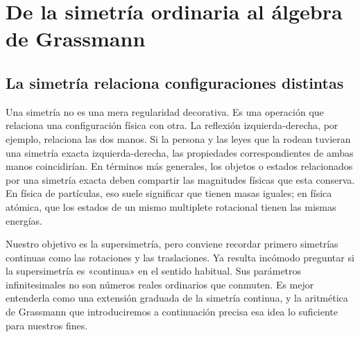 \chapter{De la simetría ordinaria al álgebra de Grassmann}


\section{La simetría relaciona configuraciones distintas}

Una simetría no es una mera regularidad decorativa. Es una operación que relaciona una configuración física con otra. La reflexión izquierda-derecha, por ejemplo, relaciona las dos manos. Si la persona y las leyes que la rodean tuvieran una simetría exacta izquierda-derecha, las propiedades correspondientes de ambas manos coincidirían. En términos más generales, los objetos o estados relacionados por una simetría exacta deben compartir las magnitudes físicas que esta conserva. En física de partículas, eso suele significar que tienen masas iguales; en física atómica, que los estados de un mismo multiplete rotacional tienen las mismas energías.

Nuestro objetivo es la supersimetría, pero conviene recordar primero simetrías continuas como las rotaciones y las traslaciones. Ya resulta incómodo preguntar si la supersimetría es «continua» en el sentido habitual. Sus parámetros infinitesimales no son números reales ordinarios que conmuten. Es mejor entenderla como una extensión graduada de la simetría continua, y la aritmética de Grassmann que introduciremos a continuación precisa esa idea lo suficiente para nuestros fines. 

